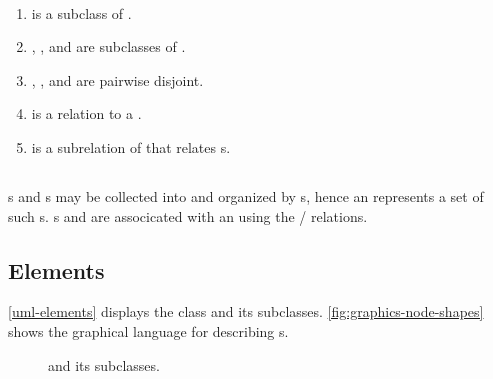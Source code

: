\begin{axioms}
  ~
  \begin{enumerate}[series=axioms,{label=(\arabic*)}]
  \item {} is a subclass of .
  \item {}, , and  are subclasses of .
  \item {}, , and  are pairwise disjoint.
  \item {} is a relation to a .
  \item {} is a subrelation of  that relates s.
  \end{enumerate}
\end{axioms}

\subsection{}

s and s may be collected into and organized by s,
hence an  represents a set of such s.
s and  are associcated with an  using the / relations.



\subsection{Elements}
\label{sec:Elements}

\autoref{uml-elements} displays the class  and its subclasses.
\autoref{fig:graphics-node-shapes} shows the graphical language for describing s.

\begin{figure}
  \centering
  \caption{\label{uml-elements}
     and its subclasses.}
\end{figure}



\subsubsection{}


